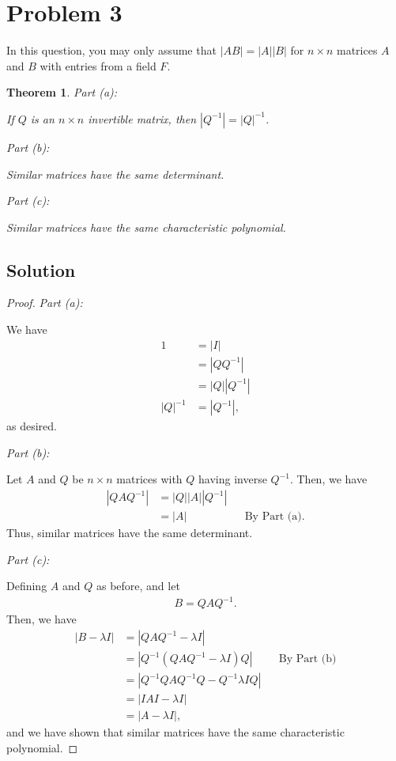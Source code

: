 \documentclass[10pt,a4paper]{article}
\makeatletter
\newtheorem{theorem}{Theorem}
\newcommand{\proofpart}[2]{%
  \par
  \addvspace{\medskipamount}%
  \noindent\emph{Part #1: #2}\par\nobreak
  \addvspace{\smallskipamount}%
  \@afterheading
}
\theoremstyle{definition}
\makeatother
\begin{document}
\section*{Problem 3}
In this question, you may only assume that $|AB| = |A||B|$ for $n \times n$ matrices $A$ and $B$ with entries from a field $F$.
\begin{theorem}
\proofpart{(a)}{} If $Q$ is an $n \times n$ invertible matrix, then $|Q^{-1}| = |Q|^{-1}$.
\proofpart{(b)}{} Similar matrices have the same determinant.
\proofpart{(c)}{} Similar matrices have the same characteristic polynomial.
\end{theorem}

\subsection*{Solution}
\begin{proof}
\proofpart{(a)}{} We have
\begin{align*}
1 &= |I| \\
&= |Q Q^{-1}|\\
&= |Q| |Q^{-1}|\\
|Q|^{-1} &= |Q^{-1}|,
\end{align*}
as desired.
\proofpart{(b)}{} Let $A$ and $Q$ be $n \times n$ matrices with $Q$ having inverse $Q^{-1}$. Then, we have
\begin{align*}
|Q A Q^{-1}| &= |Q| |A| |Q^{-1}|\\
&= |A| &&\text{By Part (a).}
\end{align*}
Thus, similar matrices have the same determinant.
\proofpart{(c)}{} Defining $A$ and $Q$ as before, and let 
\begin{align*}
B = Q A Q^{-1}.
\end{align*}
Then, we have
\begin{align*}
|B - \lambda I| &= |Q A Q^{-1} - \lambda I|\\
&= |Q^{-1}(Q A Q^{-1} - \lambda I) Q| && \text{By Part (b)}\\
&= |Q^{-1}Q A Q^{-1}Q - Q^{-1}\lambda I Q| \\
&= |IAI - \lambda I|\\
&= |A - \lambda I|,
\end{align*}
and we have shown that similar matrices have the same characteristic polynomial.
\end{proof}
\end{document}
